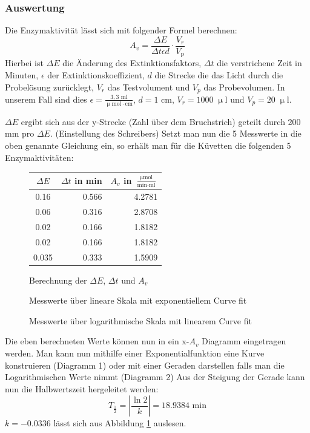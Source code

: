 \documentclass{scrartcl}
\begin{document}
\subsubsection{Auswertung}
Die Enzymaktivität lässt sich mit folgender Formel berechnen:
\begin{equation}
	A_{v}=\frac{\Delta E}{\Delta t \epsilon d}\cdot \frac{V_{r}}{V_{\text{p}}}
\end{equation}
Hierbei ist $\Delta E$ die Änderung des Extinktionsfaktors, $\Delta t$ die verstrichene Zeit in Minuten, $\epsilon$ der Extinktionskoeffizient, $d$ die Strecke die das Licht durch die Probelösung zurücklegt, $V_{r}$ das Testvolument und $V_{p}$ das Probevolumen.
In unserem Fall sind dies $\epsilon=\frac{3,3 \text{ ml}}{\upmu\text{mol}\cdot\text{cm}}$, $d=1$ cm, $V_{r}=1000\;\upmu\text{l}$ und $V_{p}=20\;\upmu\text{l}$.

$\Delta E$ ergibt sich aus der y-Strecke (Zahl über dem Bruchstrich) geteilt durch 200 mm pro $\Delta E$. (Einstellung des Schreibers)
Setzt man nun die 5 Messwerte in die oben genannte Gleichung ein, so erhält man für die Küvetten die folgenden 5 Enzymaktivitäten:

\begin{figure}[h]
	\centering
	\caption{Berechnung der $\Delta E$, $\Delta t$ und $A_v$}
\begin{tabular}{c r r}
	$\Delta E$ & $\Delta t$ in min & $A_v$ in $\frac{\upmu\text{mol}}{\text{min}\cdot\text{ml}}$ \\ \hline
   	0.16 & 0.566 &4.2781 \\
     	0.06 & 0.316 &2.8708 \\
    	0.02 & 0.166 &1.8182 \\ 
     	0.02 & 0.166 & 1.8182 \\
      	0.035 & 0.333 &1.5909
\end{tabular}
\end{figure}
\begin{figure}
	\centering
	\caption{Messwerte über lineare Skala mit exponentiellem Curve fit}
	
\end{figure}
\begin{figure}\label{fig:log}
	\centering
	\caption{Messwerte über logarithmische Skala mit linearem Curve fit}
	
\end{figure}

Die eben berechneten Werte können nun in ein x-$A_{v}$ Diagramm eingetragen werden. Man kann nun mithilfe einer Exponentialfunktion eine Kurve konstruieren (Diagramm 1) oder mit einer Geraden darstellen falls man die Logarithmischen Werte nimmt (Diagramm 2)
Aus der Steigung der Gerade kann nun die Halbwertszeit hergeleitet werden:
\begin{equation}
	T_{\frac{1}{2}} = |\frac{\ln{2}}{k}| = 18.9384\text{ min}
\end{equation}
$k = -0.0336$ lässt sich aus Abbildung \ref{fig:log} auslesen.
\end{document}
